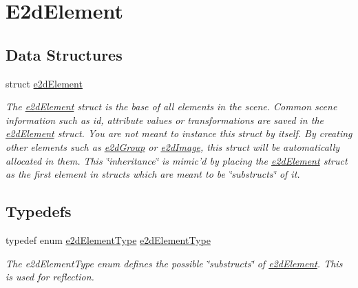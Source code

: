 \hypertarget{group__e2d_element}{\section{E2d\-Element}
\label{group__e2d_element}
}
\subsection*{Data Structures}
\begin{DoxyCompactItemize}
\item 
struct \hyperlink{structe2d_element}{e2d\-Element}
\begin{DoxyCompactList}\small\item\em The \hyperlink{structe2d_element}{e2d\-Element} struct is the base of all elements in the scene. Common scene information such as id, attribute values or transformations are saved in the \hyperlink{structe2d_element}{e2d\-Element} struct. You are not meant to instance this struct by itself. By creating other elements such as \hyperlink{structe2d_group}{e2d\-Group} or \hyperlink{structe2d_image}{e2d\-Image}, this struct will be automatically allocated in them. This \char`\"{}inheritance\char`\"{} is mimic'd by placing the \hyperlink{structe2d_element}{e2d\-Element} struct as the first element in structs which are meant to be \char`\"{}substructs\char`\"{} of it. \end{DoxyCompactList}\end{DoxyCompactItemize}
\subsection*{Typedefs}
\begin{DoxyCompactItemize}
\item 
\hypertarget{group__e2d_element_ga13e962cd8fa5eaa7d4bec3fc7d774d59}{typedef enum \hyperlink{group__e2d_element_ga9bc8cfdec08c7e9069fc707ee456fd38}{e2d\-Element\-Type} \hyperlink{group__e2d_element_ga13e962cd8fa5eaa7d4bec3fc7d774d59}{e2d\-Element\-Type}}\label{group__e2d_element_ga13e962cd8fa5eaa7d4bec3fc7d774d59}

\begin{DoxyCompactList}\small\item\em The e2d\-Element\-Type enum defines the possible \char`\"{}substructs\char`\"{} of \hyperlink{structe2d_element}{e2d\-Element}. This is used for reflection. \end{DoxyCompactList}\end{DoxyCompactItemize}
